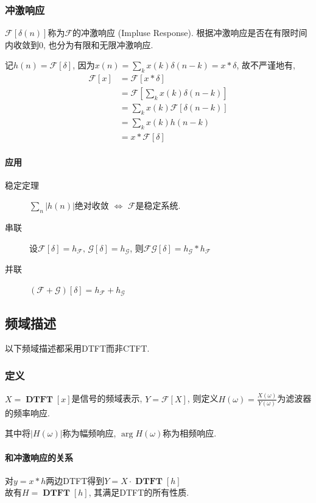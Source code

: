 \documentclass{ctexart}
\DeclareMathOperator{\DTFT}{\mathbf{DTFT}}
\begin{document}
\subsubsection{冲激响应}
    $\mathcal{F}[\delta(n)]$称为$\mathcal{F}$的冲激响应 (Impluse Response).
    根据冲激响应是否在有限时间内收敛到$0$, 也分为有限和无限冲激响应.\par
    记$h(n) = \mathcal{F}[\delta]$, 因为$x(n) = \sum_k x(k) \delta(n - k) = x * \delta$,
    故不严谨地有,
    \begin{align*}
        \mathcal{F}\left[x\right] &= \mathcal{F}\left[x * \delta\right] \\
        &= \mathcal{F}\left[\sum_k x(k)\delta(n - k)\right]\\
        &= \sum_k x(k) \mathcal{F}\left[\delta(n - k)\right]\\
        &= \sum_k x(k) h(n - k)\\
        &= x * \mathcal{F}\left[\delta\right]
    \end{align*}
\paragraph{应用} \begin{description}
        \item[稳定定理] $\sum_n |h(n)|$绝对收敛 $\Leftrightarrow$ $\mathcal{F}$是稳定系统.
        \item[串联] 设$\mathcal{F}[\delta] = h_{\mathcal{F}},\,\mathcal{G}[\delta] = h_{\mathcal{G}}$,
            则$\mathcal{F} \mathcal{G} [\delta] = h_{\mathcal{G}}  * h_{\mathcal{F}} $
        \item[并联] $\left(\mathcal{F} + \mathcal{G}\right) [\delta] = h_{\mathcal{F}} + h_{\mathcal{G}}$
    \end{description}

\subsection{频域描述}
    以下频域描述都采用DTFT而非CTFT.
\subsubsection{定义} $X = \DTFT[x]$是信号的频域表示, $Y = \mathcal{F}[X]$,
    则定义$H(\omega) = \frac{X(\omega)}{Y(\omega)}$为滤波器的频率响应.\par
    其中将$|H(\omega)|$称为幅频响应, $\arg H(\omega)$称为相频响应.
\paragraph{和冲激响应的关系} 对$y = x * h$两边DTFT得到$Y = X \cdot \DTFT[h]$\\ 故有$H = \DTFT[h]$, 其满足DTFT的所有性质.
\end{document}
